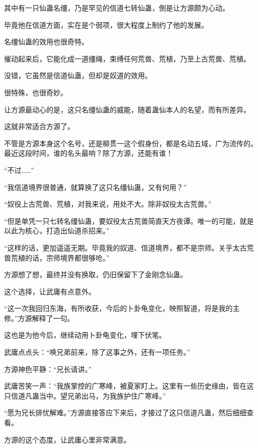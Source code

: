
\begin{this_body}



其中有一只仙蛊名缰，乃是罕见的信道七转仙蛊，倒是让方源颇为心动。

毕竟他在信道方面，实在是个弱项，很大程度上制约了他的发展。

名缰仙蛊的效用也很奇特。

催动起来后，它能化成一道缰绳，束缚任何荒兽、荒植，乃至上古荒兽、荒植。

没错，它虽然是信道仙蛊，但却是奴道的效用。

很特殊，也很奇妙。

让方源最动心的是，这只名缰仙蛊的威能，随着蛊仙本人的名望，而有所差异。

这就非常适合方源了。

不管是方源本身这个名号，还是柳贯一这个假身份，都是名动五域，广为流传的。最近这段时间，谁的名头最响？除了方源，还能有谁！

“不过……”

“我信道境界很普通，就算换了这只名缰仙蛊，又有何用？”

“奴役上古荒兽、荒植，对我来说，用处不大。除非奴役太古荒兽。”

“但是单凭一只七转名缰仙蛊，要奴役太古荒兽简直天方夜谭。唯一的可能，就是以此为核心，打造出仙道杀招来。”

“这样的话，更加遥遥无期。毕竟我的奴道、信道境界，都不是宗师。关乎太古荒兽荒植的话，宗师境界都很够呛。”

方源想了想，最终并没有换取，仍旧保留下了金刚念仙蛊。

这个选择，让武庸有点意外。

“这一次我回归东海，有所收获，今后的卜卦龟变化，映照智道，将是我的主修。”方源解释了一句。

这也是为他今后，继续动用卜卦龟变化，埋下伏笔。

武庸点点头：“唤兄弟前来，除了这事之外，还有一项任务。”

方源神色平静：“兄长请讲。”

武庸苦笑一声：“我族掌控的广寒峰，被夏家盯上。这里有一些历史缘由，皆在这只信道凡蛊当中。望兄弟出马，为我族护住广寒峰。”

“愿为兄长排忧解难。”方源直接答应下来后，才接过了这只信道凡蛊，然后细细查看。

方源的这个态度，让武庸心里非常满意。


\end{this_body}
